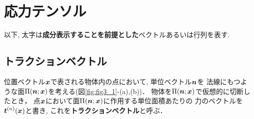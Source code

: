 \documentclass[10pt,a4j]{jbook}
\newlength{\minitwocolumn}
\begin{document}
\newcommand{\fat}[1]{\mbox{\boldmath $#1$}}
\newcommand{\D}{\partial}
\newcommand{\w}{\omega}
\newcommand{\ga}{\alpha}
\newcommand{\gb}{\beta}
\newcommand{\gx}{\xi}
\newcommand{\gz}{\zeta}
\newcommand{\vhat}[1]{\hat{\fat{#1}}}
\newcommand{\spc}{\vspace{0.7\baselineskip}}
\newcommand{\halfspc}{\vspace{0.3\baselineskip}}

\newcommand{\twofig}[2]
 {
   \begin{figure}
     \begin{minipage}[t]{\minitwocolumn}
         \begin{center}   #1
         \end{center}
     \end{minipage}
         \hspace{\columnsep}
     \begin{minipage}[t]{\minitwocolumn}
         \begin{center} #2
         \end{center}
     \end{minipage}
   \end{figure}
 }
\setcounter{chapter}{1}
\chapter{応力テンソル}
以下, 太字は{\bf 成分表示することを前提とした}ベクトルあるいは行列を表す.
\section{トラクションベクトル}
位置ベクトル$\fat{x}$で表される物体内の点において, 単位ベクトル$\fat{n}$を
法線にもつような面$\Pi(\fat{n};\fat{x})$を考える(図\ref{fig:fig3_1}-(a),(b))．
物体を$\Pi(\fat{n};\fat{x})$で仮想的に切断したとき，
点$\fat{x}$において面$\Pi(\fat{n};\fat{x})$に作用する単位面積あたりの
力のベクトルを$\fat{t}^{(n)}(\fat{x})$と書き, これを{\rm \bf トラクションベクトル}と呼ぶ．
\end{document}
